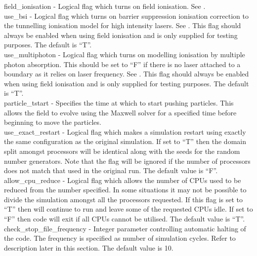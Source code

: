 {\emphtext field\_ionisation} - Logical flag which turns on field ionisation.
  See .\\

{\emphtext use\_bsi} - Logical flag which turns on barrier suppression
  ionisation correction to the tunnelling ionisation model for high intensity
  lasers. See . This flag should always be enabled when
  using field ionisation and is only supplied for testing purposes.
  The default is ``T''.\\

{\emphtext use\_multiphoton} - Logical flag which turns on modelling
  ionisation by multiple photon absorption. This should be set to ``F'' if
  there is no laser attached to a boundary as it relies on laser frequency.
  See . This flag should always be enabled when
  using field ionisation and is only supplied for testing purposes.
  The default is ``T''.\\

{\emphtext particle\_tstart} - Specifies the time at which to start pushing
particles. This allows the field to evolve using the Maxwell solver for a
specified time before beginning to move the particles.\\

{\emphtext use\_exact\_restart} - Logical flag which makes a simulation
  restart using exactly the same configuration as the original simulation. If
  set to ``T'' then the domain split amongst processors will be identical
  along with the seeds for the random number generators. Note that the flag
  will be ignored if the number of processors does not match that used in the
  original run. The default value is ``F''.\\

{\emphtext allow\_cpu\_reduce} - Logical flag which allows the number of CPUs
  used to be reduced from the number specified. In some situations it may not
  be possible to divide the simulation amongst all the processors requested.
  If this flag is set to ``T'' then {\EPOCH} will continue to run and leave
  some of the requested CPUs idle. If set to ``F'' then code will exit if all
  CPUs cannot be utilised. The default value is ``T''.\\

{\emphtext check\_stop\_file\_frequency} - Integer parameter controlling
  automatic halting of the code. The frequency is specified as number of
  simulation cycles. Refer to description later in this section.
  The default value is 10.\\

